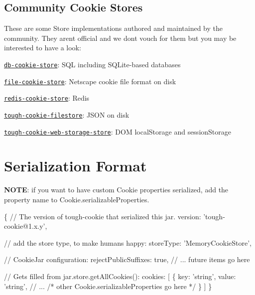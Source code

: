 \subsection*{Community Cookie Stores}

These are some Store implementations authored and maintained by the community. They aren\textquotesingle{}t official and we don\textquotesingle{}t vouch for them but you may be interested to have a look\+:


\begin{DoxyItemize}
\item \href{https://github.com/JSBizon/db-cookie-store}{\tt {\ttfamily db-\/cookie-\/store}}\+: S\+QL including S\+Q\+Lite-\/based databases
\item \href{https://github.com/JSBizon/file-cookie-store}{\tt {\ttfamily file-\/cookie-\/store}}\+: Netscape cookie file format on disk
\item \href{https://github.com/benkroeger/redis-cookie-store}{\tt {\ttfamily redis-\/cookie-\/store}}\+: Redis
\item \href{https://github.com/mitsuru/tough-cookie-filestore}{\tt {\ttfamily tough-\/cookie-\/filestore}}\+: J\+S\+ON on disk
\item \href{https://github.com/exponentjs/tough-cookie-web-storage-store}{\tt {\ttfamily tough-\/cookie-\/web-\/storage-\/store}}\+: D\+OM local\+Storage and session\+Storage
\end{DoxyItemize}

\section*{Serialization Format}

{\bfseries N\+O\+TE}\+: if you want to have custom {\ttfamily Cookie} properties serialized, add the property name to {\ttfamily Cookie.\+serializable\+Properties}.


\begin{DoxyCode}
\{
  // The version of tough-cookie that serialized this jar.
  version: 'tough-cookie@1.x.y',

  // add the store type, to make humans happy:
  storeType: 'MemoryCookieStore',

  // CookieJar configuration:
  rejectPublicSuffixes: true,
  // ... future items go here

  // Gets filled from jar.store.getAllCookies():
  cookies: [
    \{
      key: 'string',
      value: 'string',
      // ...
      /* other Cookie.serializableProperties go here */
    \}
  ]
\}
\end{DoxyCode}


